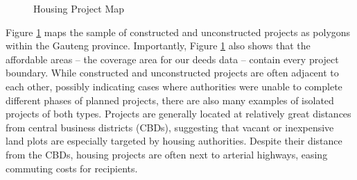 \documentclass[12pt]{article}
\begin{document}


\begin{figure}[t!]
\centering
\caption{Housing Project Map}\label{figure:map}
\end{figure}

Figure \ref{figure:map} maps the sample of constructed and unconstructed projects as polygons within the Gauteng province. Importantly, Figure \ref{figure:map} also shows that the affordable areas -- the coverage area for our deeds data -- contain every project boundary. While constructed and unconstructed projects are often adjacent to each other, possibly indicating cases where authorities were unable to complete different phases of planned projects, there are also many examples of isolated projects of both types.  Projects are generally located at relatively great distances from central business districts (CBDs), suggesting that vacant or inexpensive land plots are especially targeted by housing authorities.  Despite their distance from the CBDs, housing projects are often next to arterial highways, easing commuting costs for recipients.


\end{document}
